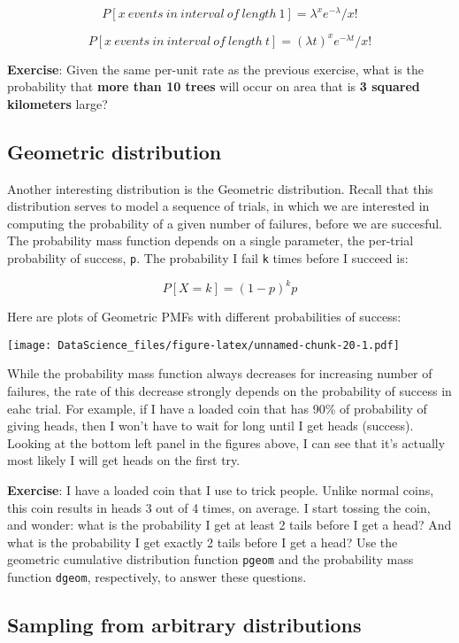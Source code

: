 \documentclass[
]{book}
\begin{document}
\[P[ x\ events\ in\ interval\ of\ length\ 1] =  \lambda^x e^{-\lambda}/x!\]

\[P[ x\ events\ in\ interval\ of\ length\ t] =  (\lambda t)^x e^{-\lambda t}/x!\]

\textbf{Exercise}: Given the same per-unit rate as the previous exercise, what is the probability that \textbf{more than 10 trees} will occur on area that is \textbf{3 squared kilometers} large?

\hypertarget{geometric-distribution}{%
\subsection{Geometric distribution}\label{geometric-distribution}}

Another interesting distribution is the Geometric distribution. Recall that this distribution serves to model a sequence of trials, in which we are interested in computing the probability of a given number of failures, before we are succesful. The probability mass function depends on a single parameter, the per-trial probability of success, \texttt{p}. The probability I fail \texttt{k} times before I succeed is:

\[P[X = k] = (1-p)^k p \]

Here are plots of Geometric PMFs with different probabilities of success:

\texttt{[image: DataScience\_files/figure-latex/unnamed-chunk-20-1.pdf]}

While the probability mass function always decreases for increasing number of failures, the rate of this decrease strongly depends on the probability of success in eahc trial. For example, if I have a loaded coin that has 90\% of probability of giving heads, then I won't have to wait for long until I get heads (success). Looking at the bottom left panel in the figures above, I can see that it's actually most likely I will get heads on the first try.

\textbf{Exercise}: I have a loaded coin that I use to trick people. Unlike normal coins, this coin results in heads 3 out of 4 times, on average. I start tossing the coin, and wonder: what is the probability I get at least 2 tails before I get a head? And what is the probability I get exactly 2 tails before I get a head? Use the geometric cumulative distribution function \texttt{pgeom} and the probability mass function \texttt{dgeom}, respectively, to answer these questions.

\hypertarget{sampling-from-arbitrary-distributions}{%
\subsection{Sampling from arbitrary distributions}\label{sampling-from-arbitrary-distributions}}
\end{document}
